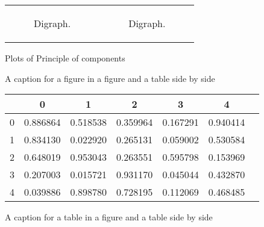 \documentclass[a4paper,twoside]{report}
\begin{document}
\begin{figure}[htbp]
\begin{tabular}[c]{cc}
\begin{subfigure}[c]{0.4\textwidth}
 
 \caption{Digraph.}
 \label{fig:digraph}
 \end{subfigure}&
 \begin{subfigure}[c]{0.4\textwidth}
 
 \null\hfill
 \caption{Digraph.}
 \label{fig:digraph}
 \end{subfigure}\\
 
 
 
\end{tabular}
 \caption{Plots of Principle of components}\label{fig:bubble plots}
 \end{figure}
 
\begin{figure}
 \CenterFloatBoxes
 \begin{floatrow}
 \ffigbox
 {}
 {\caption{A caption for a figure in a figure and a table side by side}\label{fig:test}}
 \killfloatstyle
 \ttabbox
 {
 \begin{tabular}[c]{|l|c|c|c|c|c|c|}
 \hline
 {} & 0 & 1 & 2 & 3 & 4 \\
 \hline
 0 & 0.886864 & 0.518538 & 0.359964 & 0.167291 & 0.940414 \\
 1 & 0.834130 & 0.022920 & 0.265131 & 0.059002 & 0.530584 \\
 2 & 0.648019 & 0.953043 & 0.263551 & 0.595798 & 0.153969 \\
 3 & 0.207003 & 0.015721 & 0.931170 & 0.045044 & 0.432870 \\
 4 & 0.039886 & 0.898780 & 0.728195 & 0.112069 & 0.468485 \\
 \hline
 \end{tabular}
 }
 {\caption{A caption for a table in a figure and a table side by side}\label{tab:test}}
 \end{floatrow}
 
\end{figure}
 
\end{document}
